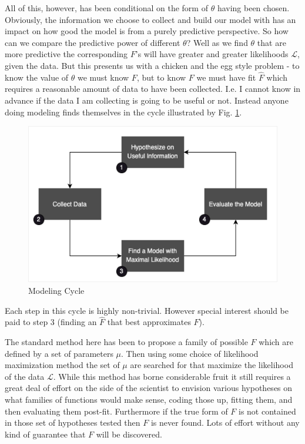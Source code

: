 \documentclass[11pt]{article}
\begin{document}
All of this, however, has been conditional on the form of $\theta$ having been chosen. Obviously, the information we choose to collect and build our model with has an impact on how good the model is from a purely predictive perspective. So how can we compare the predictive power of different $\theta$? Well as we find $\theta$ that are more predictive the corresponding $F$'s will have greater and greater likelihoods $\mathcal{L}$, given the data. But this presents us with a chicken and the egg style problem - to know the value of $\theta$ we must know $F$, but to know $F$ we must have fit $\hat{F}$ which requires a reasonable amount of data to have been collected. I.e. I cannot know in advance if the data I am collecting is going to be useful or not. Instead anyone doing modeling finds themselves in the cycle illustrated by Fig. \ref{fig:model_cycle}.

\begin{figure}[h!] 
  \includegraphics[width=\linewidth]{model_cycle.png}
  \caption{Modeling Cycle}
  \label{fig:model_cycle}
\end{figure}

Each step in this cycle is highly non-trivial. However special interest should be paid to step 3 (finding an $\hat{F}$ that best approximates $F$). 

The standard method here has been to propose a family of possible $F$ which are defined by a set of parameters $\mu$. Then using some choice of likelihood maximization method the set of $\mu$ are searched for that maximize the likelihood of the data $\mathcal{L}$. While this method has borne considerable fruit it still requires a great deal of effort on the side of the scientist to envision various hypotheses on what families of functions would make sense, coding those up, fitting them, and then evaluating them post-fit. Furthermore if the true form of $F$ is not contained in those set of hypotheses tested then $F$ is never found. Lots of effort without any kind of guarantee that $F$ will be discovered.  
\end{document}
